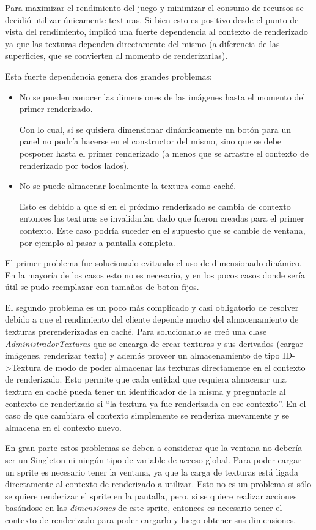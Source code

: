 \documentclass[titlepage,a4paper,12pt]{article}
\begin{document}
Para maximizar el rendimiento del juego y minimizar el consumo de recursos se decidió utilizar únicamente texturas. Si bien esto es positivo desde el punto de vista del rendimiento, implicó una fuerte dependencia al contexto de renderizado ya que las texturas dependen directamente del mismo (a diferencia de las superficies, que se convierten al momento de renderizarlas).  

Esta fuerte dependencia genera dos grandes problemas:
\begin{itemize}
\item No se pueden conocer las dimensiones de las imágenes hasta el momento del primer renderizado.

Con lo cual, si se quisiera dimensionar dinámicamente un botón para un panel no podría hacerse en el constructor del mismo, sino que se debe posponer hasta el primer renderizado (a menos que se arrastre el contexto de renderizado por todos lados).

\item No se puede almacenar localmente la textura como caché.

Esto es debido a que si en el próximo renderizado se cambia de contexto entonces las texturas se invalidarían dado que fueron creadas para el primer contexto. Este caso podría suceder en el supuesto que se cambie de ventana, por ejemplo al pasar a pantalla completa.
\end{itemize}

El primer problema fue solucionado evitando el uso de dimensionado dinámico. En la mayoría de los casos esto no es necesario, y en los pocos casos donde sería útil se pudo reemplazar con tamaños de boton fijos.

El segundo problema es un poco más complicado y casi obligatorio de resolver debido a que el rendimiento del cliente depende mucho del almacenamiento de texturas prerenderizadas en caché. Para solucionarlo se creó una clase \textit{AdministradorTexturas} que se encarga de crear texturas y sus derivados (cargar imágenes, renderizar texto) y además proveer un almacenamiento de tipo ID->Textura de modo de poder almacenar las texturas directamente en el contexto de renderizado. Esto permite que cada entidad que requiera almacenar una textura en caché pueda tener un identificador de la misma y preguntarle al contexto de renderizado si ``la textura ya fue renderizada en ese contexto''. En el caso de que cambiara el contexto simplemente se renderiza nuevamente y se almacena en el contexto nuevo.

En gran parte estos problemas se deben a considerar que la ventana no debería ser un Singleton ni ningún tipo de variable de acceso global. Para poder cargar un sprite es necesario tener la ventana, ya que la carga de texturas está ligada directamente al contexto de renderizado a utilizar. Esto no es un problema si sólo se quiere renderizar el sprite en la pantalla, pero, si se quiere realizar acciones basándose en las \textit{dimensiones} de este sprite, entonces es necesario tener el contexto de renderizado para poder cargarlo y luego obtener sus dimensiones.
\end{document}
